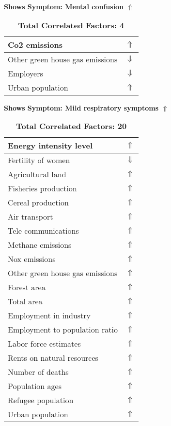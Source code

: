\documentclass[12pt,notitlepage,oneside]{report}
\begin{document}
\begin{table}[!htb]
\caption{\textbf{Shows Symptom: Mental confusion $\Uparrow$}}
\centering
\label{Correlated Socio-economic Factors0}
\begin{tabular}{|l|l|}
\hline
Co2 emissions & $\Uparrow$\\ \hline
Other green house gas emissions & $\Downarrow$\\ \hline
Employers & $\Downarrow$\\ \hline
Urban population & $\Uparrow$\\ \hline
\end{tabular}
\caption*{\textbf{Total Correlated Factors: 4}}
\end{table}
\begin{table}[!htb]
\caption{\textbf{Shows Symptom: Mild respiratory symptoms $\Uparrow$}}
\centering
\label{Correlated Socio-economic Factors0}
\begin{tabular}{|l|l|}
\hline
Energy intensity level & $\Uparrow$\\ \hline
Fertility of women & $\Downarrow$\\ \hline
Agricultural land & $\Uparrow$\\ \hline
Fisheries production & $\Uparrow$\\ \hline
Cereal production & $\Uparrow$\\ \hline
Air transport  & $\Uparrow$\\ \hline
Tele-communications & $\Uparrow$\\ \hline
Methane emissions & $\Uparrow$\\ \hline
Nox emissions & $\Uparrow$\\ \hline
Other green house gas emissions & $\Uparrow$\\ \hline
Forest area & $\Uparrow$\\ \hline
Total area & $\Uparrow$\\ \hline
Employment in industry & $\Uparrow$\\ \hline
Employment to population ratio & $\Uparrow$\\ \hline
Labor force estimates & $\Uparrow$\\ \hline
Rents on natural resources & $\Uparrow$\\ \hline
Number of deaths & $\Uparrow$\\ \hline
Population ages & $\Uparrow$\\ \hline
Refugee population & $\Uparrow$\\ \hline
Urban population & $\Uparrow$\\ \hline
\end{tabular}
\caption*{\textbf{Total Correlated Factors: 20}}
\end{table}
\end{document}
